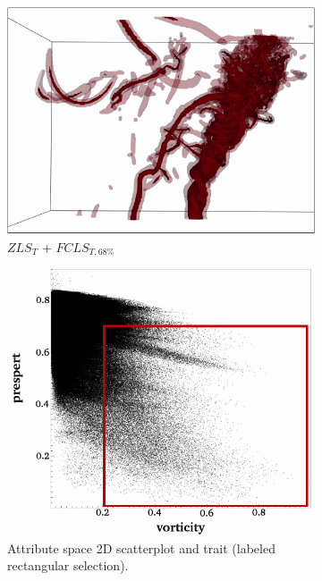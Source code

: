 \begin{figure}[h]
\begin{subfigure}{0.26\linewidth}
\includegraphics[width=\linewidth]{Images/Tornado/fcls_68.pdf}
\caption{$ZLS_{T}$ + $FCLS_{T,68\%}$}
\label{}
\end{subfigure}
\begin{subfigure}{0.17\linewidth}
\centering
\includegraphics[width=\linewidth]{Images/Tornado/scatterplot.pdf}
\caption{Attribute space 2D scatterplot and trait (labeled rectangular selection).} 
\label{}
\end{subfigure}
\caption{}
\label{}
\end{figure}
